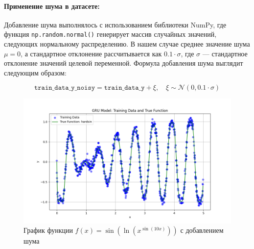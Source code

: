 \paragraph{Применение шума в датасете:}
Добавление шума выполнялось с использованием библиотеки NumPy, где функция \texttt{np.random.normal()} генерирует массив случайных значений, следующих нормальному распределению. В нашем случае среднее значение шума $\mu = 0$, а стандартное отклонение рассчитывается как $0.1 \cdot \sigma$, где $\sigma$ --- стандартное отклонение значений целевой переменной. Формула добавления шума выглядит следующим образом:

\[
\texttt{train\_data\_y\_noisy} = \texttt{train\_data\_y} + \xi, \quad \xi \sim \mathcal{N}(0, 0.1 \cdot \sigma)
\]

\begin{figure}[H]
    \begin{columns}
    \begin{column}{\textwidth}
        \centering
        \includegraphics[width=1\textwidth]{figures/hardsin_train_data_with_noise.png}
        \caption{График функции $f(x) = \sin\left(\ln(x^{\sin(10x)})\right)$ с добавлением шума}
        \label{fig:hardsin_graph}
        \vspace{0.3cm}
    \end{column}
    \end{columns}
\end{figure}


